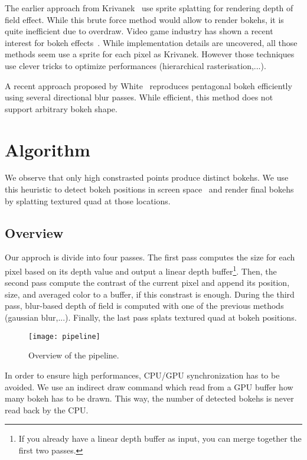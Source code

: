 The earlier approach from Krivanek~\cite{Krivanek03} use sprite splatting for rendering depth of field effect. While this brute force method would allow to render bokehs, it is quite inefficient due to overdraw. Video game industry has shown a recent interest for bokeh effects~\cite{Sousa11,Futurmark11,Mittring11}. While implementation details are uncovered, all those methods seem use a sprite for each pixel as Krivanek. However those techniques use clever tricks to optimize performances (hierarchical rasterisation,...). 

A recent approach proposed by White~\cite{White11} reproduces pentagonal bokeh efficiently using several directional blur passes. While efficient, this method does not support arbitrary bokeh shape.

\section{Algorithm}
We observe that only high constrasted points produce distinct bokehs. We use this heuristic to detect bokeh positions in screen space~\cite{Pettineo11} and render final bokehs by splatting textured quad at those locations.

\subsection{Overview}
Our approch is divide into four passes. The first pass computes the \coc size for each pixel based on its depth value and output a linear depth buffer\footnote{If you already have a linear depth buffer as input, you can merge together the first two passes.}. Then, the second pass compute the contrast of the current pixel and append its position, \coc size, and averaged color to a buffer, if this constrast is enough. During the third pass, blur-based depth of field is computed with one of the previous methods (gaussian blur,...). Finally, the last pass splats textured quad at bokeh positions.

	\begin{figure}[htb]\centering
	\texttt{[image: pipeline]}
	\caption{Overview of the pipeline.}
	\label{YourName:fig1}
	\end{figure}

In order to ensure high performances, CPU/GPU synchronization has to be avoided. We use an indirect draw command which read from a GPU buffer how many bokeh has to be drawn. This way, the number of detected bokehs is never read back by the CPU.

